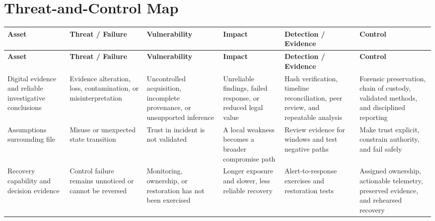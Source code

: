 \documentclass[11pt]{article}
\begin{document}
\section*{Threat-and-Control Map}
\begingroup\scriptsize\setlength{\tabcolsep}{2pt}
\begin{longtable}{>{\RaggedRight\arraybackslash}p{}>{\RaggedRight\arraybackslash}p{}>{\RaggedRight\arraybackslash}p{}>{\RaggedRight\arraybackslash}p{}>{\RaggedRight\arraybackslash}p{}>{\RaggedRight\arraybackslash}p{}}
\toprule\rowcolor{Navy}\color{white}\textbf{Asset} & \color{white}\textbf{Threat / Failure} & \color{white}\textbf{Vulnerability} & \color{white}\textbf{Impact} & \color{white}\textbf{Detection / Evidence} & \color{white}\textbf{Control}\\\midrule
\endfirsthead
\toprule\rowcolor{Navy}\color{white}\textbf{Asset} & \color{white}\textbf{Threat / Failure} & \color{white}\textbf{Vulnerability} & \color{white}\textbf{Impact} & \color{white}\textbf{Detection / Evidence} & \color{white}\textbf{Control}\\\midrule
\endhead
Digital evidence and reliable investigative conclusions & Evidence alteration, loss, contamination, or misinterpretation & Uncontrolled acquisition, incomplete provenance, or unsupported inference & Unreliable findings, failed response, or reduced legal value & Hash verification, timeline reconciliation, peer review, and repeatable analysis & Forensic preservation, chain of custody, validated methods, and disciplined reporting\\\midrule
Assumptions surrounding file & Misuse or unexpected state transition & Trust in incident is not validated & A local weakness becomes a broader compromise path & Review evidence for windows and test negative paths & Make trust explicit, constrain authority, and fail safely\\\midrule
Recovery capability and decision evidence & Control failure remains unnoticed or cannot be reversed & Monitoring, ownership, or restoration has not been exercised & Longer exposure and slower, less reliable recovery & Alert-to-response exercises and restoration tests & Assigned ownership, actionable telemetry, preserved evidence, and rehearsed recovery\\\midrule
\bottomrule
\end{longtable}
\endgroup
\end{document}
